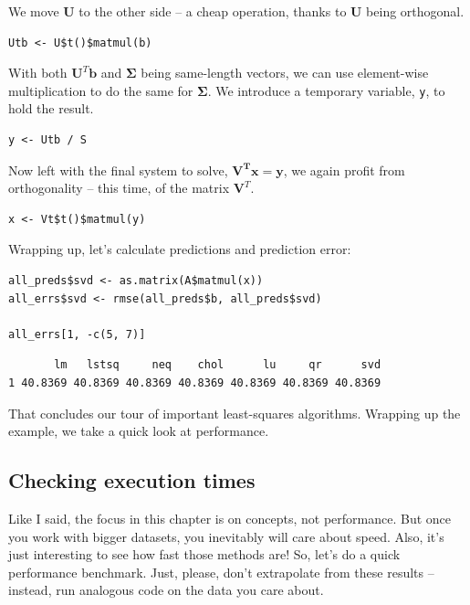 \documentclass[
  letterpaper,
]{krantz}
\begin{document}
We move \(\mathbf{U}\) to the other side -- a cheap operation, thanks to
\(\mathbf{U}\) being orthogonal.

\begin{verbatim}
Utb <- U$t()$matmul(b)
\end{verbatim}

With both \(\mathbf{U}^T\mathbf{b}\) and \(\symbf{\Sigma}\) being
same-length vectors, we can use element-wise multiplication to do the
same for \(\symbf{\Sigma}\). We introduce a temporary variable,
\texttt{y}, to hold the result.

\begin{verbatim}
y <- Utb / S
\end{verbatim}

Now left with the final system to solve,
\(\mathbf{\mathbf{V}^T\mathbf{x} = \mathbf{y}}\), we again profit from
orthogonality -- this time, of the matrix \(\mathbf{V}^T\).

\begin{verbatim}
x <- Vt$t()$matmul(y)
\end{verbatim}

Wrapping up, let's calculate predictions and prediction error:

\begin{verbatim}
all_preds$svd <- as.matrix(A$matmul(x))
all_errs$svd <- rmse(all_preds$b, all_preds$svd)

all_errs[1, -c(5, 7)]
\end{verbatim}

\begin{verbatim}
       lm   lstsq     neq    chol      lu     qr      svd
1 40.8369 40.8369 40.8369 40.8369 40.8369 40.8369 40.8369
\end{verbatim}

That concludes our tour of important least-squares algorithms. Wrapping
up the example, we take a quick look at performance.

\hypertarget{checking-execution-times}{%
\subsection{Checking execution times}\label{checking-execution-times}}

Like I said, the focus in this chapter is on concepts, not performance.
But once you work with bigger datasets, you inevitably will care about
speed. Also, it's just interesting to see how fast those methods are!
So, let's do a quick performance benchmark. Just, please, don't
extrapolate from these results -- instead, run analogous code on the
data you care about.
\end{document}
